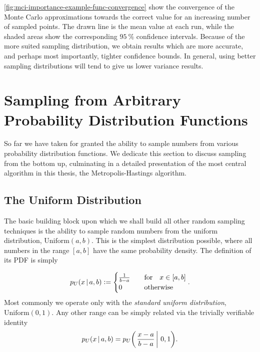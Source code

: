 \documentclass[Thesis.tex]{subfiles}
\begin{document}
\autoref{fig:mci-importance-example-func-convergence} show the convergence of
the Monte Carlo approximations towards the correct value for an increasing
number of sampled points. The drawn line is the mean value at each run, while
the shaded areas show the corresponding $\SI{95}{\percent}$ confidence
intervals. Because of the more suited sampling distribution, we obtain results
which are more accurate, and perhaps most importantly, tighter confidence
bounds. In general, using better sampling distributions will tend to give us
lower variance results.

\section{Sampling from Arbitrary Probability Distribution Functions}
\label{sec:sampling-arb-prob-dist-funcs}

So far we have taken for granted the ability to sample numbers from various
probability distribution functions. We dedicate this section to discuss sampling from the bottom up, culminating in a detailed presentation of the most central algorithm in this thesis, the Metropolis-Hastings algorithm.

\subsection{The Uniform Distribution}

The basic building block upon which we shall build all other random sampling
techniques is the ability to sample random numbers from the uniform
distribution, $\text{Uniform}(a, b)$. This is the simplest distribution
possible, where all numbers in the range $[a, b]$ have the same probability
density. The definition of its PDF is simply

\begin{align}\label{eq:uniform-pdf-definition}
    p_U(x\,|\, a, b) \defeq  \begin{cases}
        \frac{1}{b - a} &\qfor x\in [a, b]\\
        0&\qotherwise
    \end{cases}.
\end{align}
Most commonly we operate only with the \emph{standard uniform distribution}, $\text{Uniform}(0, 1)$. Any other range can be simply related via the trivially verifiable identity
\begin{align}
    p_U(x\,|\, a,b) = p_U\qty(\left. \frac{x-a}{b-a} \,\right|\, 0, 1).
\end{align}
\end{document}
